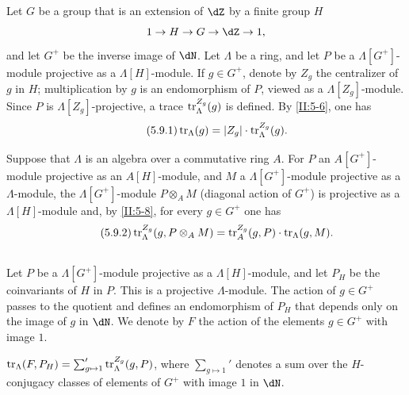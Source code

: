 \subsection{}\label{II:5-9}

Let $G$ be a group that is an extension of $\dZ$ by a finite group $H$
\[
  1 \to H \to G \to \dZ \to 1 \text{,}
\]
and let $G^+$ be the inverse image of $\dN$. Let $\Lambda$ be a ring, and let
$P$ be a $\Lambda[G^+]$-module projective as a $\Lambda[H]$-module. If
$g\in G^+$, denote by $Z_g$ the centralizer of $g$ in $H$; multiplication by
$g$ is an endomorphism of $P$, viewed as a $\Lambda[Z_g]$-module. Since $P$
is $\Lambda[Z_g]$-projective, a trace $\operatorname{tr}_\Lambda^{Z_g}(g)$ is defined. By
\ref{II:5-6}, one has
\begin{equation*}\tag{5.9.1}\label{II:eq:5-9-1}
  \operatorname{tr}_\Lambda(g) = |Z_g| \cdot \operatorname{tr}_\Lambda^{Z_g}(g) \text{.}
\end{equation*}

Suppose that $\Lambda$ is an algebra over a commutative ring $A$. For $P$ an
$A[G^+]$-module projective as an $A[H]$-module, and $M$ a
$\Lambda[G^+]$-module projective as a $\Lambda$-module, the
$\Lambda[G^+]$-module $P\otimes_A M$ (diagonal action of $G^+$) is projective
as a $\Lambda[H]$-module and, by \ref{II:5-8}, for every $g\in G^+$ one has
\begin{equation*}\tag{5.9.2}\label{II:eq:5-9-2}
  \operatorname{tr}_\Lambda^{Z_g}(g,P\otimes_A M) = \operatorname{tr}_A^{Z_g}(g,P) \cdot \operatorname{tr}_\Lambda(g,M) \text{.}
\end{equation*}






\subsection{}\label{II:5-10}

Let $P$ be a $\Lambda[G^+]$-module projective as a $\Lambda[H]$-module, and
let $P_H$ be the coinvariants of $H$ in $P$. This is a projective
$\Lambda$-module. The action of $g\in G^+$ passes to the quotient and defines
an endomorphism of $P_H$ that depends only on the image of $g$ in $\dN$. We
denote by $F$ the action of the elements $g\in G^+$ with image $1$.






\begin{proposition_}\label{II:5-11}
$\operatorname{tr}_\Lambda(F,P_H) = \sum_{g\mapsto 1}' \operatorname{tr}_\Lambda^{Z_g}(g,P)$, where
$\sum_{g\mapsto 1}'$ denotes a sum over the $H$-conjugacy classes of elements
of $G^+$ with image $1$ in $\dN$.
\end{proposition_}

